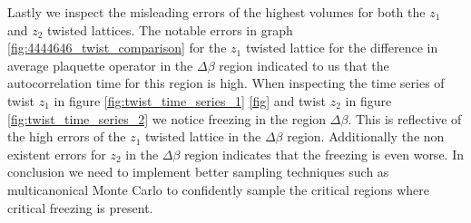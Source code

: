 \documentclass[english,twoside,openright]{UH_TCM_MSc}
\begin{document}
Lastly we inspect the misleading errors of the highest volumes for both the $z_1$ and $z_2$ twisted lattices. The notable errors in graph \ref{fig:4444646_twist_comparison} for the $z_1$ twisted lattice for the difference in average plaquette operator in the $\Delta \beta$ region indicated to us that the autocorrelation time for this region is high. When inspecting the time series of twist $z_1$ in figure \ref{fig:twist_time_series_1} \ref{fig} and twist $z_2$ in figure \ref{fig:twist_time_series_2} we notice freezing in the region $\Delta \beta$. This is reflective of the high errors of the $z_1$ twisted lattice in the $\Delta \beta$ region. Additionally the non existent errors for $z_2$ in the $\Delta \beta$ region indicates that the freezing is even worse. In conclusion we need to implement better sampling techniques such as multicanonical Monte Carlo \cite{Berg_1992} to confidently sample the critical regions where critical freezing is present. 



 



\cleardoublepage %


\end{document}
